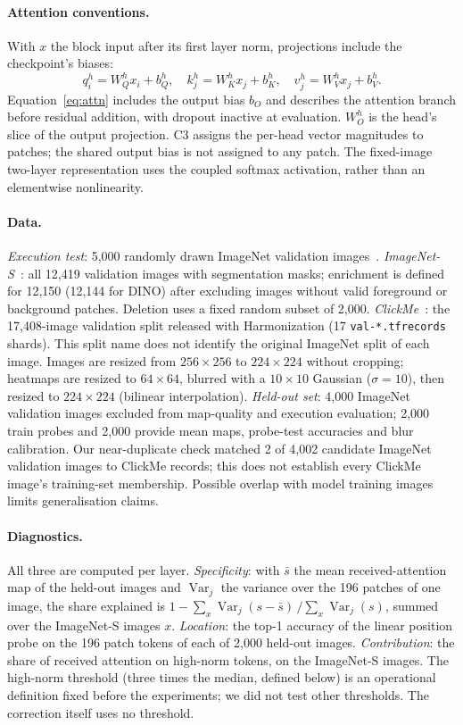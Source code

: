 \paragraph{Attention conventions.} With $x$ the block input after its first layer norm, projections include the checkpoint's biases:
\[
q_i^h=W_Q^hx_i+b_Q^h,\quad k_j^h=W_K^hx_j+b_K^h,\quad v_j^h=W_V^hx_j+b_V^h.
\]
Equation~\ref{eq:attn} includes the output bias $b_O$ and describes the attention branch before residual addition, with dropout inactive at evaluation. $W_O^h$ is the head's slice of the output projection. C3 assigns the per-head vector magnitudes to patches; the shared output bias is not assigned to any patch. The fixed-image two-layer representation uses the coupled softmax activation, rather than an elementwise nonlinearity.

\paragraph{Data.} \emph{Execution test}: 5,000 randomly drawn ImageNet validation images~\citep{deng2009}. \emph{ImageNet-S}~\citep{gao2023}: all 12,419 validation images with segmentation masks; enrichment is defined for 12,150 (12,144 for DINO) after excluding images without valid foreground or background patches. Deletion uses a fixed random subset of 2,000. \emph{ClickMe}~\citep{linsley2019,fel2022}: the 17,408-image validation split released with Harmonization (17 \texttt{val-*.tfrecords} shards). This split name does not identify the original ImageNet split of each image. Images are resized from $256{\times}256$ to $224{\times}224$ without cropping; heatmaps are resized to $64{\times}64$, blurred with a $10{\times}10$ Gaussian ($\sigma=10$), then resized to $224{\times}224$ (bilinear interpolation). \emph{Held-out set}: 4,000 ImageNet validation images excluded from map-quality and execution evaluation; 2,000 train probes and 2,000 provide mean maps, probe-test accuracies and blur calibration. Our near-duplicate check matched 2 of 4,002 candidate ImageNet validation images to ClickMe records; this does not establish every ClickMe image's training-set membership. Possible overlap with model training images limits generalisation claims.

\paragraph{Diagnostics.} All three are computed per layer. \emph{Specificity}: with $\bar s$ the mean received-attention map of the held-out images and $\operatorname{Var}_j$ the variance over the 196 patches of one image, the share explained is $1-\sum_x\operatorname{Var}_j(s-\bar s)\,/\sum_x\operatorname{Var}_j(s)$, summed over the ImageNet-S images $x$. \emph{Location}: the top-1 accuracy of the linear position probe on the 196 patch tokens of each of 2,000 held-out images. \emph{Contribution}: the share of received attention on high-norm tokens, on the ImageNet-S images. The high-norm threshold (three times the median, defined below) is an operational definition fixed before the experiments; we did not test other thresholds. The correction itself uses no threshold.

